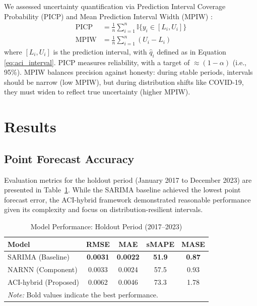 \documentclass[final,3p,times,twocolumn,authoryear]{elsarticle}
\begin{document}
We assessed uncertainty quantification via Prediction Interval Coverage Probability (PICP) and Mean Prediction Interval Width (MPIW) \citep{khosravi2011lower}:
\begin{align}
\text{PICP} &= \frac{1}{n}\sum_{i=1}^{n}\mathbb{I}\{y_i \in [L_i, U_i]\} \\
\text{MPIW} &= \frac{1}{n}\sum_{i=1}^{n}(U_i - L_i)
\end{align}
where $[L_i, U_i]$ is the prediction interval, with $\hat{q}_i$ defined as in Equation \eqref{eq:aci_interval}. PICP measures reliability, with a target of $\approx (1-\alpha)$ (i.e., 95\%). MPIW balances precision against honesty: during stable periods, intervals should be narrow (low MPIW), but during distribution shifts like COVID-19, they must widen to reflect true uncertainty (higher MPIW).

\section{Results}
\label{sec:results}

\subsection{Point Forecast Accuracy}
\label{subsec:point_forecast}
Evaluation metrics for the holdout period (January 2017 to December 2023) are presented in Table~\ref{tab:holdout_metrics}. While the SARIMA baseline achieved the lowest point forecast error, the ACI-hybrid framework demonstrated reasonable performance given its complexity and focus on distribution-resilient intervals.

\begin{table}[t]
\centering
\caption{Model Performance: Holdout Period (2017--2023)}
\label{tab:holdout_metrics}
\begin{tabular}{lcccc}
\toprule
\textbf{Model} & \textbf{RMSE} & \textbf{MAE} & \textbf{sMAPE} & \textbf{MASE} \\ \midrule
SARIMA (Baseline) & \textbf{0.0031} & \textbf{0.0022} & \textbf{51.9} & \textbf{0.87} \\
NARNN (Component) & 0.0033 & 0.0024 & 57.5 & 0.93 \\
ACI-hybrid (Proposed) & 0.0062 & 0.0046 & 73.3 & 1.78 \\ \bottomrule
\multicolumn{5}{l}{\footnotesize \textit{Note:} Bold values indicate the best performance.}
\end{tabular}
\end{table}
\end{document}

